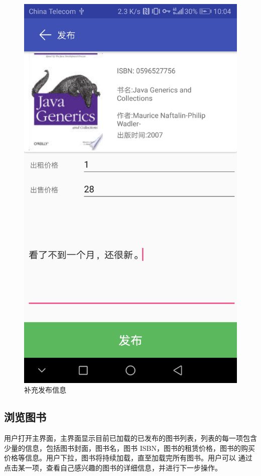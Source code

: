 \begin{figure}[h]
	\centering
	\includegraphics[scale=0.09]{Chapters/UI/release_form.jpg}
	\caption{补充发布信息}
	\label{release_from}
\end{figure}

\subsection{浏览图书}
用户打开主界面，主界面显示目前已加载的已发布的图书列表，列表的每一项包含少量的信息，包括图书封面，图书名，图书
ISBN，图书的租赁价格，图书的购买价格等信息。用户下拉，图书将持续加载，直至加载完所有图书。用户可以
通过点击某一项，查看自己感兴趣的图书的详细信息，并进行下一步操作。

